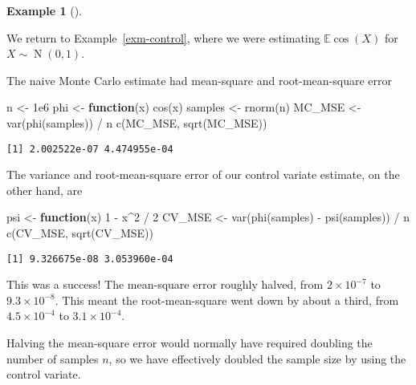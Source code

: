 \documentclass[
  letterpaper,
  DIV=11,
  numbers=noendperiod]{scrreprt}
\newenvironment{Shaded}{\begin{snugshade}}{\end{snugshade}}
\newcommand{\ControlFlowTok}[1]{\textcolor[rgb]{0.00,0.23,0.31}{\textbf{#1}}}
\newcommand{\DecValTok}[1]{\textcolor[rgb]{0.68,0.00,0.00}{#1}}
\newcommand{\FloatTok}[1]{\textcolor[rgb]{0.68,0.00,0.00}{#1}}
\newcommand{\FunctionTok}[1]{\textcolor[rgb]{0.28,0.35,0.67}{#1}}
\newcommand{\NormalTok}[1]{\textcolor[rgb]{0.00,0.23,0.31}{#1}}
\newcommand{\OtherTok}[1]{\textcolor[rgb]{0.00,0.23,0.31}{#1}}
\newcommand{\SpecialCharTok}[1]{\textcolor[rgb]{0.37,0.37,0.37}{#1}}
\newcommand{\Ex}{\mathbb{E}}
\theoremstyle{plain}
\theoremstyle{definition}
\theoremstyle{definition}
\newtheorem{example}{Example}[chapter]
\theoremstyle{remark}
\begin{document}
\begin{example}[]\protect\hypertarget{exm-control2}{}\label{exm-control2}

We return to Example~\ref{exm-control}, where we were estimating
\(\Ex \cos(X)\) for \(X \sim \operatorname{N}(0,1)\).

The naive Monte Carlo estimate had mean-square and root-mean-square
error

\begin{Shaded}
\begin{Highlighting}[]
\NormalTok{n }\OtherTok{\textless{}{-}} \FloatTok{1e6}
\NormalTok{phi }\OtherTok{\textless{}{-}} \ControlFlowTok{function}\NormalTok{(x) }\FunctionTok{cos}\NormalTok{(x)}
\NormalTok{samples }\OtherTok{\textless{}{-}} \FunctionTok{rnorm}\NormalTok{(n)}
\NormalTok{MC\_MSE }\OtherTok{\textless{}{-}} \FunctionTok{var}\NormalTok{(}\FunctionTok{phi}\NormalTok{(samples)) }\SpecialCharTok{/}\NormalTok{ n}
\FunctionTok{c}\NormalTok{(MC\_MSE, }\FunctionTok{sqrt}\NormalTok{(MC\_MSE))}
\end{Highlighting}
\end{Shaded}

\begin{verbatim}
[1] 2.002522e-07 4.474955e-04
\end{verbatim}

The variance and root-mean-square error of our control variate estimate,
on the other hand, are

\begin{Shaded}
\begin{Highlighting}[]
\NormalTok{psi }\OtherTok{\textless{}{-}} \ControlFlowTok{function}\NormalTok{(x) }\DecValTok{1} \SpecialCharTok{{-}}\NormalTok{ x}\SpecialCharTok{\^{}}\DecValTok{2} \SpecialCharTok{/} \DecValTok{2}
\NormalTok{CV\_MSE }\OtherTok{\textless{}{-}} \FunctionTok{var}\NormalTok{(}\FunctionTok{phi}\NormalTok{(samples) }\SpecialCharTok{{-}} \FunctionTok{psi}\NormalTok{(samples)) }\SpecialCharTok{/}\NormalTok{ n}
\FunctionTok{c}\NormalTok{(CV\_MSE, }\FunctionTok{sqrt}\NormalTok{(CV\_MSE))}
\end{Highlighting}
\end{Shaded}

\begin{verbatim}
[1] 9.326675e-08 3.053960e-04
\end{verbatim}

This was a success! The mean-square error roughly halved, from
\(\ensuremath{2\times 10^{-7}}\) to \(\ensuremath{9.3\times 10^{-8}}\).
This meant the root-mean-square went down by about a third, from
\(\ensuremath{4.5\times 10^{-4}}\) to
\(\ensuremath{3.1\times 10^{-4}}\).

Halving the mean-square error would normally have required doubling the
number of samples \(n\), so we have effectively doubled the sample size
by using the control variate.

\end{example}
\end{document}
